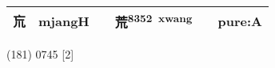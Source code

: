 \documentclass[14pt,a4paper]{scrartcl}
\begin{document}
\begin{longtable}[c]{@{}llllll@{}}
\begin{minipage}[t]{0.14\columnwidth}\raggedright\strut
巟
\strut\end{minipage} &
\begin{minipage}[t]{0.14\columnwidth}\raggedright\strut
mjangH
\strut\end{minipage} &
\begin{minipage}[t]{0.14\columnwidth}\raggedright\strut
\strut\end{minipage} &
\begin{minipage}[t]{0.14\columnwidth}\raggedright\strut
荒\textsuperscript{8352~xwang}
\strut\end{minipage} &
\begin{minipage}[t]{0.14\columnwidth}\raggedright\strut
\strut\end{minipage} &
\begin{minipage}[t]{0.14\columnwidth}\raggedright\strut
pure:A
\strut\end{minipage}\tabularnewline
\bottomrule
\end{longtable}

(181) 0745 {[}2{]}
\end{document}
